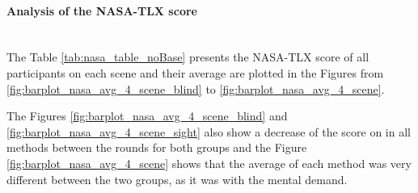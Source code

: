 \paragraph{Analysis of the NASA-TLX score}\mbox{}\\

The Table \ref{tab:nasa_table_noBase} presents the NASA-TLX score of all participants on each scene and their average are plotted in the Figures from \ref{fig:barplot_nasa_avg_4_scene_blind} to \ref{fig:barplot_nasa_avg_4_scene}. 



The Figures \ref{fig:barplot_nasa_avg_4_scene_blind} and \ref{fig:barplot_nasa_avg_4_scene_sight} also show a decrease of the score on in all methods between the rounds for both groups and the Figure \ref{fig:barplot_nasa_avg_4_scene} shows that the average of each method was very different between the two groups, as it was with the mental demand.

